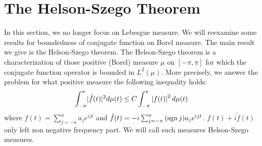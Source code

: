 % 
\section{The Helson-Szego Theorem}
In this section, we no longer focus on Lebesgue measure. We will reexamine some results for boundedness of conjugate function on Borel measure.
The main result we give is the Helson-Szego theorem. The Helson-Szego theorem is a characterization of those positive (Borel) measure $\mu$ on $[-\pi,\pi]$ for which the conjugate function
operator is bounded in $L^2(\mu)$. More precisely, we answer the problem for what positive measure the following inequality holds:
\begin{equation*}
    \int_{-\pi}^{\pi}\lvert\tilde{f}(t)\rvert^2 d\mu(t)\leq C\int_{-\pi}^{\pi}\left\lvert f(t)\right\rvert^2 d\mu(t)
\end{equation*}
where $f(t)=\sum_{j=-n}^{n}{a_je^{ijt}}$ and $\tilde{f}(t)=-i\sum_{j=-n}^{n}{(\operatorname{sgn} j)a_je^{ijt}}$. $f(t)+i\tilde{f}(t)$ only left non negative frequency part.
We will call such measures Helson-Szego measures.
